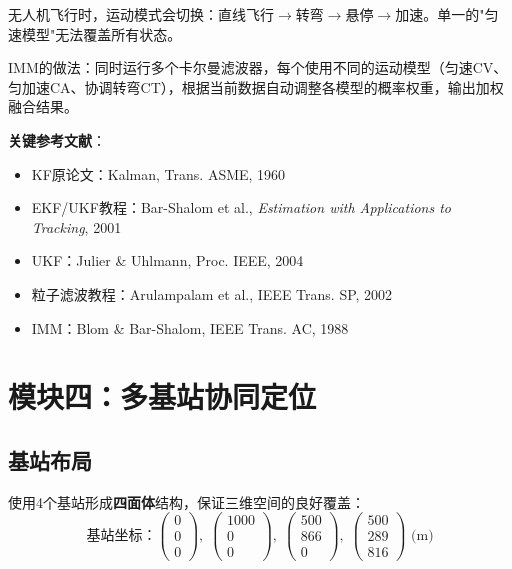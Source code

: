 \documentclass[12pt, a4paper]{article}
\begin{document}
无人机飞行时，运动模式会切换：直线飞行$\to$转弯$\to$悬停$\to$加速。单一的"匀速模型"无法覆盖所有状态。

IMM的做法：同时运行多个卡尔曼滤波器，每个使用不同的运动模型（匀速CV、匀加速CA、协调转弯CT），根据当前数据自动调整各模型的概率权重，输出加权融合结果。

\textbf{关键参考文献}：
\begin{itemize}
  \item KF原论文：Kalman, Trans. ASME, 1960
  \item EKF/UKF教程：Bar-Shalom et al., \textit{Estimation with Applications to Tracking}, 2001
  \item UKF：Julier \& Uhlmann, Proc. IEEE, 2004
  \item 粒子滤波教程：Arulampalam et al., IEEE Trans. SP, 2002
  \item IMM：Blom \& Bar-Shalom, IEEE Trans. AC, 1988
\end{itemize}

\section{模块四：多基站协同定位}

\subsection{基站布局}

使用4个基站形成\textbf{四面体}结构，保证三维空间的良好覆盖：
\begin{equation}
\text{基站坐标：}
\begin{pmatrix}0\\0\\0\end{pmatrix},\;
\begin{pmatrix}1000\\0\\0\end{pmatrix},\;
\begin{pmatrix}500\\866\\0\end{pmatrix},\;
\begin{pmatrix}500\\289\\816\end{pmatrix}
\text{ (m)}
\end{equation}
\end{document}
